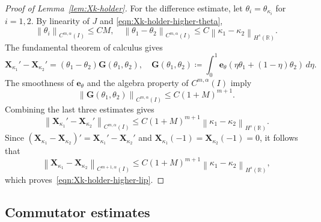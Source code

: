 \documentclass[11pt,reqno]{amsart}
\theoremstyle{plain}
\theoremstyle{definition}
\numberwithin{equation}{section}
\newcommand{\paren}[1]{\left(#1\right)}
\newcommand{\bm}[1]{\boldsymbol{#1}}
\newcommand{\norm}[1]{\left\lVert #1 \right\rVert}
\newcommand{\R}{\mathbb{R}}
\newcommand{\xka}[1]{\bm X_{\kappa_{#1}}}
\newcommand{\ci}[1]{C^{#1}(I)}
\newcommand{\hr}[1]{H^{#1}(\R)}
\begin{document}
\begin{proof}[Proof of Lemma~\ref{lem:Xk-holder}]
For the difference estimate, let
$\theta_i=\theta_{\kappa_i}$ for $i=1,2$. By linearity of $J$ and
\eqref{eqn:Xk-holder-higher-theta},
\begin{equation}
    \norm{\theta_i}_{\ci{m,\alpha}} \le C M,
    \quad
    \norm{\theta_1-\theta_2}_{\ci{m,\alpha}}
    \le C \norm{\kappa_1-\kappa_2}_{\hr{s}}.
\end{equation}
The fundamental theorem of calculus gives
\begin{equation}
    \xka{1}'-\xka{2}'
    = \paren{\theta_1-\theta_2}\bm G(\theta_1,\theta_2),
    \quad
    \bm G(\theta_1,\theta_2)
    \coloneqq \int_0^1 \bm e_\theta\paren{\eta\theta_1+(1-\eta)\theta_2}\,d\eta.
\end{equation}
The smoothness of $\bm e_\theta$ and the algebra property of
$\ci{m,\alpha}$ imply
\begin{equation}
    \norm{\bm G(\theta_1,\theta_2)}_{\ci{m,\alpha}} \le C\paren{1+M}^{m+1}.
\end{equation}
Combining the last three estimates gives
\begin{equation}
    \norm{\xka{1}'-\xka{2}'}_{\ci{m,\alpha}}
    \le C\paren{1+M}^{m+1}\norm{\kappa_1-\kappa_2}_{\hr{s}}.
\end{equation}
Since $(\xka{1}-\xka{2})'=\xka{1}'-\xka{2}'$ and
$\xka{1}(-1)=\xka{2}(-1)=0$, it follows that
\begin{equation}
    \norm{\xka{1}-\xka{2}}_{\ci{m+1,\alpha}}
    \le C\paren{1+M}^{m+1}\norm{\kappa_1-\kappa_2}_{\hr{s}},
\end{equation}
which proves~\eqref{eqn:Xk-holder-higher-lip}.
\end{proof}

\subsection{Commutator estimates}
\label{app:commutator-estimates}
\end{document}
